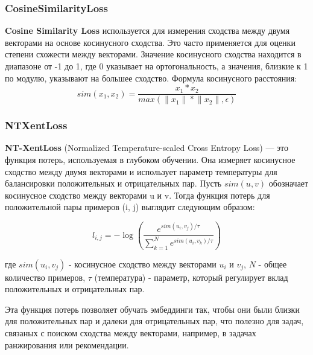 \subsubsection{CosineSimilarityLoss}
\textbf{Cosine Similarity Loss} используется для измерения сходства между двумя векторами на основе косинусного сходства. Это часто применяется для оценки степени схожести между векторами. Значение косинусного сходства находится в диапазоне от -1 до 1, где 0 указывает на ортогональность, а значения, близкие к 1 по модулю, указывают на большее сходство.
Формула косинусного расстояния:
\begin{equation}
sim(x_1, x_2) = \frac{x_1 * x_2}{max(\lVert x_1 \rVert * \lVert x_2 \rVert, \epsilon)}
\end{equation}

\subsubsection{NTXentLoss}
\textbf{NT-XentLoss} (Normalized Temperature-scaled Cross Entropy Loss) — это функция потерь, используемая в глубоком обучении. Она измеряет косинусное сходство между двумя векторами и использует параметр температуры для балансировки положительных и отрицательных пар. Пусть $sim(u, v)$ обозначает косинусное сходство между векторами u и v. Тогда функция потерь для положительной пары примеров (i, j) выглядит следующим образом:

\begin{equation}
l_{i, j} = -\log\left(\frac{e^{sim(u_i, v_j) / \tau}}{\sum_{k=1}^{N} e^{sim(u_i, v_k) / \tau}}\right)
\end{equation}

где $sim(u_i, v_j)$ - косинусное сходство между векторами $u_i$ и $v_j$, $N$ - общее количество примеров, $\tau$ (температура) - параметр, который регулирует вклад положительных и отрицательных пар.

Эта функция потерь позволяет обучать эмбеддинги так, чтобы они были близки для положительных пар и далеки для отрицательных пар, что полезно для задач, связаных с поиском сходства между векторами, например, в задачах ранжирования или рекомендации.


\newpage
